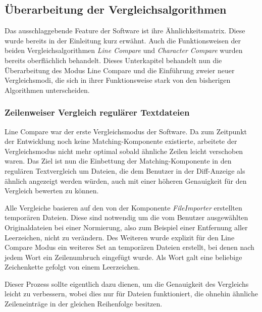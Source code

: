 \subsection{Überarbeitung der Vergleichsalgorithmen}

Das ausschlaggebende Feature der Software ist ihre Ähnlichkeitsmatrix. Diese wurde bereits in der Einleitung kurz erwähnt. Auch die Funktionsweisen der beiden Vergleichsalgorithmen \textit{Line Compare} und \textit{Character Compare} wurden bereits oberflächlich behandelt. Dieses Unterkapitel behandelt nun die Überarbeitung des Modus Line Compare und die Einführung zweier neuer Vergleichsmodi, die sich in ihrer Funktionsweise stark von den bisherigen Algorithmen unterscheiden.

\subsubsection{Zeilenweiser Vergleich regulärer Textdateien}

Line Compare war der erste Vergleichsmodus der Software. Da zum Zeitpunkt der Entwicklung noch keine Matching-Komponente existierte, arbeitete der Vergleichsmodus nicht mehr optimal sobald ähnliche Zeilen leicht verschoben waren. Das Ziel ist nun die Einbettung der Matching-Komponente in den regulären Textvergleich um Dateien, die dem Benutzer in der Diff-Anzeige als ähnlich angezeigt werden würden, auch mit einer höheren Genauigkeit für den Vergleich bewerten zu können.

Alle Vergleiche basieren auf den von der Komponente \emph{FileImporter} erstellten temporären Dateien. Diese sind notwendig um die vom Benutzer ausgewählten Originaldateien bei einer Normierung, also zum Beispiel einer Entfernung aller Leerzeichen, nicht zu verändern. Des Weiteren wurde explizit für den Line Compare Modus ein weiteres Set an temporären Dateien erstellt, bei denen nach jedem Wort ein Zeilenumbruch eingefügt wurde. Als Wort galt eine beliebige Zeichenkette gefolgt von einem Leerzeichen.  

Dieser Prozess sollte eigentlich dazu dienen, um die Genauigkeit des Vergleichs leicht zu verbessern, wobei dies nur für Dateien funktioniert, die ohnehin ähnliche Zeileneinträge in der gleichen Reihenfolge besitzen.

